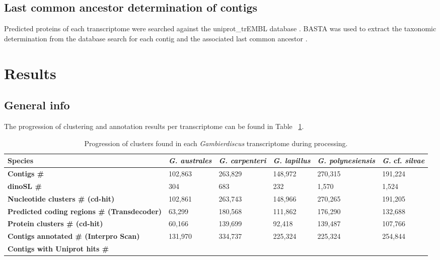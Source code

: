\documentclass[12pt]{article}
\begin{document}
\subsection*{Last common ancestor determination of contigs}
Predicted proteins of each transcriptome were searched against the uniprot\_trEMBL database \cite{uniprot2010ongoing}. 
BASTA was used to extract the taxonomic determination from the database search for each contig and the associated last common ancestor  \cite{timbasta}.

\newpage
\section*{Results}
\FloatBarrier
\subsection*{General info}
The progression of clustering and annotation results per transcriptome can be found in Table ~\ref{tbl:ClustTable}.\\

\begin{table}
\caption{Progression of clusters found in each \emph{Gambierdiscus} transcriptome during processing.}
\label{tbl:ClustTable}
\begin{tabular}{ | p{3cm} | p{2cm} | p{2.5cm} | p{2.5cm} | p{2cm} | p{2cm}|}
\hline
\textbf{Species}& \textit{G. australes}& \emph{G. carpenteri}&\emph{G. lapillus}&\emph{G. polynesiensis}&\emph{G.} cf. \emph{silvae}\\
\hline
\textbf{Contigs \#}&102,863&263,829&148,972&270,315&191,224\\
\hline
\textbf{dinoSL \#}&304&683&232&1,570&1,524\\
\hline
\textbf{Nucleotide clusters \# (cd-hit)}&102,861&263,743&148,966&270,265&191,205\\
\hline
\textbf{Predicted coding regions \# (Transdecoder)}&63,299&180,568&111,862&176,290&132,688\\
\hline
\textbf{Protein clusters \# (cd-hit)}&60,166&139,699&92,418&139,487&107,766\\
\hline
\textbf{Contigs annotated \# (Interpro Scan)}&131,970&334,737&225,324&225,324&254,844\\ 
\hline
\textbf{Contigs with Uniprot hits \#}&&&&&\\ 
\hline
\end{tabular}
\end{table}
\FloatBarrier
\newpage
\end{document}
